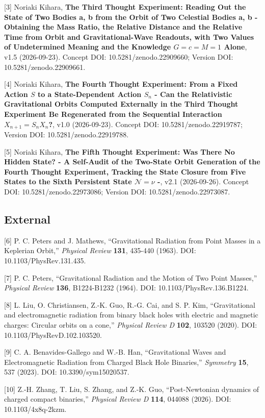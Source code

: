 \documentclass[
  a4paper,
]{article}
\begin{document}
{[}3{]} Noriaki Kihara, \textbf{The Third Thought Experiment: Reading
Out the State of Two Bodies a, b from the Orbit of Two Celestial Bodies
a, b - Obtaining the Mass Ratio, the Relative Distance and the Relative
Time from Orbit and Gravitational-Wave Readouts, with Two Values of
Undetermined Meaning and the Knowledge \(G=c=M=1\) Alone}, v1.5
(2026-09-23). Concept DOI: 10.5281/zenodo.22909660; Version DOI:
10.5281/zenodo.22909661.

{[}4{]} Noriaki Kihara, \textbf{The Fourth Thought Experiment: From a
Fixed Action \(S\) to a State-Dependent Action \(S_n\) - Can the
Relativistic Gravitational Orbits Computed Externally in the Third
Thought Experiment Be Regenerated from the Sequential Interaction
\(X_{n+1}=S_nX_n\)?}, v1.0 (2026-09-23). Concept DOI:
10.5281/zenodo.22919787; Version DOI: 10.5281/zenodo.22919788.

{[}5{]} Noriaki Kihara, \textbf{The Fifth Thought Experiment: Was There
No Hidden State? - A Self-Audit of the Two-State Orbit Generation of the
Fourth Thought Experiment, Tracking the State Closure from Five States
to the Sixth Persistent State \(\mathcal N=\nu\) -}, v2.1 (2026-09-26).
Concept DOI: 10.5281/zenodo.22973086; Version DOI:
10.5281/zenodo.22973087.

\subsection{External}\label{external}

{[}6{]} P. C. Peters and J. Mathews, ``Gravitational Radiation from
Point Masses in a Keplerian Orbit,'' \emph{Physical Review}
\textbf{131}, 435-440 (1963). DOI: 10.1103/PhysRev.131.435.

{[}7{]} P. C. Peters, ``Gravitational Radiation and the Motion of Two
Point Masses,'' \emph{Physical Review} \textbf{136}, B1224-B1232 (1964).
DOI: 10.1103/PhysRev.136.B1224.

{[}8{]} L. Liu, O. Christiansen, Z.-K. Guo, R.-G. Cai, and S. P. Kim,
``Gravitational and electromagnetic radiation from binary black holes
with electric and magnetic charges: Circular orbits on a cone,''
\emph{Physical Review D} \textbf{102}, 103520 (2020). DOI:
10.1103/PhysRevD.102.103520.

{[}9{]} C. A. Benavides-Gallego and W.-B. Han, ``Gravitational Waves and
Electromagnetic Radiation from Charged Black Hole Binaries,''
\emph{Symmetry} \textbf{15}, 537 (2023). DOI: 10.3390/sym15020537.

{[}10{]} Z.-H. Zhang, T. Liu, S. Zhang, and Z.-K. Guo, ``Post-Newtonian
dynamics of charged compact binaries,'' \emph{Physical Review D}
\textbf{114}, 044088 (2026). DOI: 10.1103/4x8q-2kzm.
\end{document}

